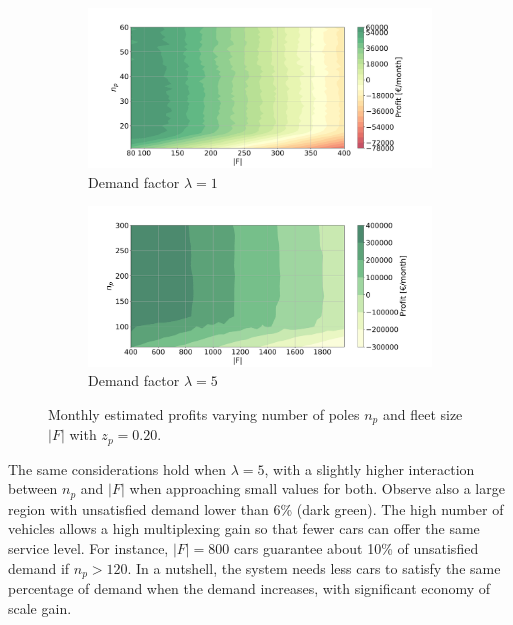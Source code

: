 \begin{figure}[ht]
	\begin{subfigure}{0.5\textwidth}
		\centering
		\includegraphics[width=1\linewidth]{fig/final/contour_profit_rate-1.pdf}  
		\caption{Demand factor $\lambda=1$}
		\label{fig:10_5_profits_rate-1}
	\end{subfigure}
	\begin{subfigure}{0.5\textwidth}
		\centering
		\includegraphics[width=1\linewidth]{fig/final/contour_profit_rate-5.pdf}  
		\caption{Demand factor $\lambda=5$}
		\label{fig:10_5_profits_rate-5}
	\end{subfigure}
	\caption{Monthly estimated profits varying number of poles $n_p$ and fleet size $|F|$ with $z_p=0.20$.}
	\label{fig:10_5_profits_rate}
\end{figure}



The same considerations hold when $\lambda=5$, with a slightly higher interaction between $n_p$ and $|F|$ when approaching small values for both. Observe also a large region with unsatisfied demand lower than 6\% (dark green). The high number of vehicles allows a high multiplexing gain so that fewer cars can offer the same service level. For instance, $|F|=800$ cars guarantee about 10\% of unsatisfied demand if $n_p>120$. In a nutshell, the system needs less cars to satisfy the same percentage of demand when the demand increases, with significant economy of scale gain.


